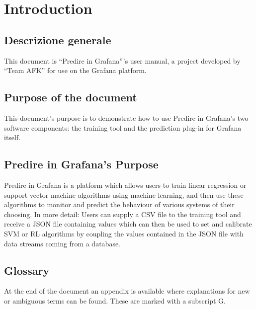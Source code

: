 \section{Introduction}

\subsection{Descrizione generale}
This document is “Predire in Grafana”’s user manual, a project developed by “Team AFK” for use on the Grafana platform.

\subsection{Purpose of the document}
This document’s purpose is to demonstrate how to use Predire in Grafana’s two software components: the training tool and the prediction plug-in for Grafana itself.

\subsection{Predire in Grafana’s Purpose}
Predire in Grafana is a platform which allows users to train linear regression or support vector machine algorithms using machine learning, and then use these algorithms to monitor and predict the behaviour of various systems of their choosing.
In more detail:	
Users can supply a CSV file to the training tool and receive a JSON file containing values which can then be used to set and calibrate SVM or RL algorithms by coupling the values contained in the JSON file with data streams coming from a database.

\subsection{Glossary}
At the end of the document an appendix is available where explanations for new or ambiguous terms can be found. These are marked with a subscript G.

